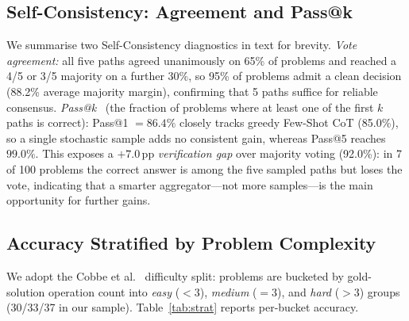 \documentclass[conference]{IEEEtran}
\begin{document}
\subsection{Self-Consistency: Agreement and Pass@k}
\label{sec:results:passk}

We summarise two Self-Consistency diagnostics in text for brevity.
\emph{Vote agreement:} all five paths agreed unanimously on 65\% of
problems and reached a 4/5 or 3/5 majority on a further 30\%, so 95\%
of problems admit a clean decision (88.2\% average majority margin),
confirming that 5 paths suffice for reliable consensus.
\emph{Pass@k}~\cite{chen2021codex} (the fraction of problems where at
least one of the first $k$ paths is correct): Pass@1 $=86.4\%$ closely
tracks greedy Few-Shot CoT (85.0\%), so a single stochastic sample adds
no consistent gain, whereas Pass@5 reaches $99.0\%$.
This exposes a $+7.0$\,pp \textit{verification gap} over majority
voting (92.0\%): in 7 of 100 problems the correct answer is among the
five sampled paths but loses the vote, indicating that a smarter
aggregator---not more samples---is the main opportunity for further
gains.

\subsection{Accuracy Stratified by Problem Complexity}
\label{sec:results:stratified}

We adopt the Cobbe et al.~\cite{cobbe2021gsm8k} difficulty split:
problems are bucketed by gold-solution operation count into
\textit{easy} ($<3$), \textit{medium} ($=3$), and \textit{hard}
($>3$) groups (30/33/37 in our sample).
Table~\ref{tab:strat} reports per-bucket accuracy.
\end{document}
